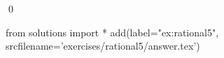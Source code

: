 
\begin{ex} 
  \label{ex:rational5}
  
  \qed
\end{ex} 
\begin{python0}
from solutions import *
add(label="ex:rational5",
    srcfilename='exercises/rational5/answer.tex') 
\end{python0}
